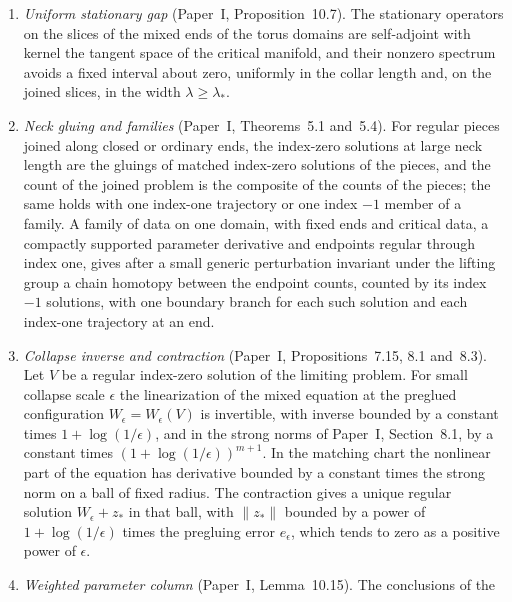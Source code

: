 \documentclass[11pt]{amsart}
\theoremstyle{definition}
\theoremstyle{remark}
\theoremstyle{plain}
\numberwithin{equation}{section}
\begin{document}
\begin{enumerate}[label=(I\arabic*),ref=(I\arabic*)]
The admissible neighbourhood $\mathcal U(F)$ is the path component of zero in
$\mathcal U_F(t_*)\cap\mathcal U_F(t_*')$ for two heights $t_*'\le t_*$ fixed with the
splitting. It is an open neighbourhood of zero in $\operatorname{span}F$, and
$\mathcal U(F)\subseteq\mathcal U(F')$ for $F\subseteq F'$. Admissibility is a condition on the
primary data through the path joining them to zero, not on their Lagrangians alone.
\item\label{I6} \emph{Uniform stationary gap} (Paper~I, Proposition~10.7). The stationary operators
on the slices of the mixed ends of the torus domains are self-adjoint with kernel the tangent space
of the critical manifold, and their nonzero spectrum avoids a fixed interval about zero, uniformly
in the collar length and, on the joined slices, in the width $\lambda\ge\lambda_*$.
\item\label{I7} \emph{Neck gluing and families} (Paper~I, Theorems~5.1 and~5.4). For regular
pieces joined along closed or ordinary ends, the index-zero solutions at large neck length are the
gluings of matched index-zero solutions of the pieces, and the count of the joined problem is the
composite of the counts of the pieces; the same holds with one index-one trajectory or one index
$-1$ member of a family. A family of data on one domain, with fixed ends and critical data, a
compactly supported parameter derivative and endpoints regular through index one, gives after a
small generic perturbation invariant under the lifting group a chain homotopy between the endpoint
counts, counted by its index $-1$ solutions, with one boundary branch for each such solution and
each index-one trajectory at an end.
\item\label{I8} \emph{Collapse inverse and contraction} (Paper~I, Propositions~7.15, 8.1 and~8.3).
Let $V$ be a regular index-zero solution of the limiting problem. For small collapse scale
$\epsilon$ the linearization of the mixed equation at the preglued configuration
$W_\epsilon=W_\epsilon(V)$ is invertible, with inverse bounded by a constant times
$1+\log(1/\epsilon)$, and in the strong norms of Paper~I, Section~8.1, by a constant times
$(1+\log(1/\epsilon))^{m+1}$. In the matching chart the nonlinear part of the equation has
derivative bounded by a constant times the strong norm on a ball of fixed radius. The contraction
gives a unique regular solution $W_\epsilon+z_*$ in that ball, with $\|z_*\|$ bounded by a power of
$1+\log(1/\epsilon)$ times the pregluing error $e_\epsilon$, which tends to zero as a positive power
of $\epsilon$.
\item\label{I9} \emph{Weighted parameter column} (Paper~I, Lemma~10.15). The conclusions of the

\end{enumerate}
\end{document}
